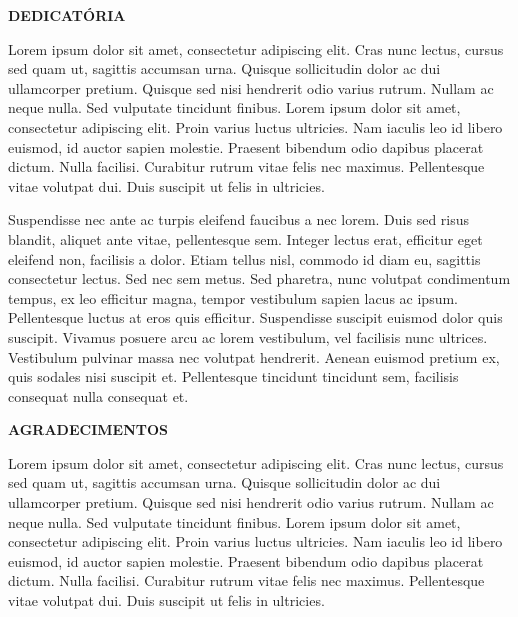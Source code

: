 \newpage


\thispagestyle{empty}

\begin{flushleft}
\textbf{DEDICATÓRIA}
\end{flushleft}

Lorem ipsum dolor sit amet, consectetur adipiscing elit. Cras nunc lectus, cursus sed quam ut, sagittis accumsan urna. Quisque sollicitudin dolor ac dui ullamcorper pretium. Quisque sed nisi hendrerit odio varius rutrum. Nullam ac neque nulla. Sed vulputate tincidunt finibus. Lorem ipsum dolor sit amet, consectetur adipiscing elit. Proin varius luctus ultricies. Nam iaculis leo id libero euismod, id auctor sapien molestie. Praesent bibendum odio dapibus placerat dictum. Nulla facilisi. Curabitur rutrum vitae felis nec maximus. Pellentesque vitae volutpat dui. Duis suscipit ut felis in ultricies.

Suspendisse nec ante ac turpis eleifend faucibus a nec lorem. Duis sed risus blandit, aliquet ante vitae, pellentesque sem. Integer lectus erat, efficitur eget eleifend non, facilisis a dolor. Etiam tellus nisl, commodo id diam eu, sagittis consectetur lectus. Sed nec sem metus. Sed pharetra, nunc volutpat condimentum tempus, ex leo efficitur magna, tempor vestibulum sapien lacus ac ipsum. Pellentesque luctus at eros quis efficitur. Suspendisse suscipit euismod dolor quis suscipit. Vivamus posuere arcu ac lorem vestibulum, vel facilisis nunc ultrices. Vestibulum pulvinar massa nec volutpat hendrerit. Aenean euismod pretium ex, quis sodales nisi suscipit et. Pellentesque tincidunt tincidunt sem, facilisis consequat nulla consequat et.

\newpage

\thispagestyle{empty}

\begin{flushleft}
\textbf{AGRADECIMENTOS}
\end{flushleft}

Lorem ipsum dolor sit amet, consectetur adipiscing elit. Cras nunc lectus, cursus sed quam ut, sagittis accumsan urna. Quisque sollicitudin dolor ac dui ullamcorper pretium. Quisque sed nisi hendrerit odio varius rutrum. Nullam ac neque nulla. Sed vulputate tincidunt finibus. Lorem ipsum dolor sit amet, consectetur adipiscing elit. Proin varius luctus ultricies. Nam iaculis leo id libero euismod, id auctor sapien molestie. Praesent bibendum odio dapibus placerat dictum. Nulla facilisi. Curabitur rutrum vitae felis nec maximus. Pellentesque vitae volutpat dui. Duis suscipit ut felis in ultricies.

